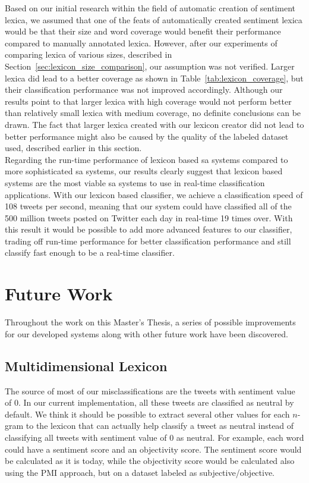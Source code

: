 Based on our initial research within the field of automatic creation of sentiment lexica, we assumed that one of the feats of automatically created sentiment lexica would be that their size and word coverage would benefit their performance compared to manually annotated lexica. However, after our experiments of comparing lexica of various sizes, described in Section~\ref{sec:lexicon_size_comparison}, our assumption was not verified. Larger lexica did lead to a better coverage as shown in Table~\ref{tab:lexicon_coverage}, but their classification performance was not improved accordingly. Although our results point to that larger lexica with high coverage would not perform better than relatively small lexica with medium coverage, no definite conclusions can be drawn. The fact that larger lexica created with our lexicon creator did not lead to better performance might also be caused by the quality of the labeled dataset used, described earlier in this section. \\

Regarding the run-time performance of lexicon based \ac{sa} systems compared to more sophisticated \ac{sa} systems, our results clearly suggest that lexicon based systems are the most viable \ac{sa} systems to use in real-time classification applications. With our lexicon based classifier, we achieve a classification speed of 108 tweets per second, meaning that our system could have classified all of the 500 million tweets posted on Twitter each day in real-time 19 times over. With this result it would be possible to add more advanced features to our classifier, trading off run-time performance for better classification performance and still classify fast enough to be a real-time classifier.


\section{Future Work}
\label{sec:future_work}
Throughout the work on this Master's Thesis, a series of possible improvements for our developed systems along with other future work have been discovered. \\

\subsection{Multidimensional Lexicon}
The source of most of our misclassifications are the tweets with sentiment value of 0. In our current implementation, all these tweets are classified as neutral by default. We think it should be possible to extract several other values for each $n$-gram to the lexicon that can actually help classify a tweet as neutral instead of classifying all tweets with sentiment value of 0 as neutral. For example, each word could have a sentiment score and an objectivity score. The sentiment score would be calculated as it is today, while the objectivity score would be calculated also using the PMI approach, but on a dataset labeled as subjective/objective. 


